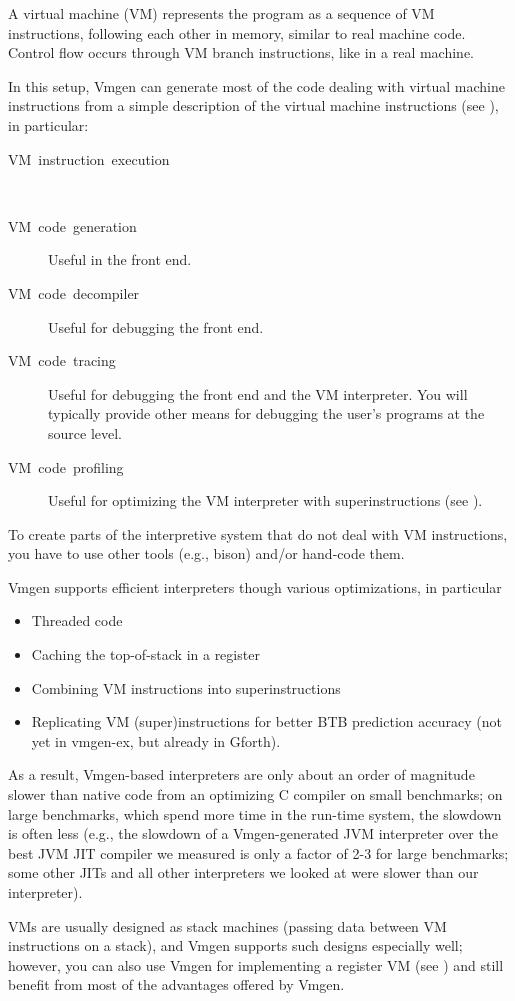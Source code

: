 \documentclass[10pt,english]{article}
\begin{document}
A virtual machine (VM) represents the program as a sequence of VM
instructions, following each other in memory, similar to real machine
code. Control flow occurs through VM branch instructions, like in
a real machine.

In this setup, Vmgen can generate most of the code dealing with virtual
machine instructions from a simple description of the virtual machine
instructions (see ), in particular:
\begin{description}
\item [{VM~instruction~execution}]~
\item [{VM~code~generation}] Useful in the front end.
\item [{VM~code~decompiler}] Useful for debugging the front end.
\item [{VM~code~tracing}] Useful for debugging the front end and the
VM interpreter. You will typically provide other means for debugging
the user's programs at the source level.
\item [{VM~code~profiling}] Useful for optimizing the VM interpreter
with superinstructions (see ).
\end{description}
To create parts of the interpretive system that do not deal with VM
instructions, you have to use other tools (e.g., bison) and/or hand-code
them.

Vmgen supports efficient interpreters though various optimizations,
in particular
\begin{itemize}
\item Threaded code
\item Caching the top-of-stack in a register
\item Combining VM instructions into superinstructions
\item Replicating VM (super)instructions for better BTB prediction accuracy
(not yet in vmgen-ex, but already in Gforth).
\end{itemize}
As a result, Vmgen-based interpreters are only about an order of magnitude
slower than native code from an optimizing C compiler on small benchmarks;
on large benchmarks, which spend more time in the run-time system,
the slowdown is often less (e.g., the slowdown of a Vmgen-generated
JVM interpreter over the best JVM JIT compiler we measured is only
a factor of 2-3 for large benchmarks; some other JITs and all other
interpreters we looked at were slower than our interpreter).

VMs are usually designed as stack machines (passing data between VM
instructions on a stack), and Vmgen supports such designs especially
well; however, you can also use Vmgen for implementing a register
VM (see ) and still benefit from most
of the advantages offered by Vmgen.
\end{document}
